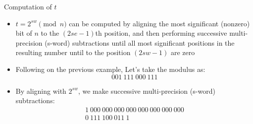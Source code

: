 \documentclass[xcolor=dvipsnames]{beamer}
\begin{document}
\begin{frame}{Computation of $t$}
\begin{itemize}

\item $t=2^{sw} \pmod{n}$ can be computed by aligning the most significant (nonzero)
bit of $n$ to the $(2se-1)$th position, and then performing successive 
multi-precision (s-word) subtractions
until all most significant positions in the resulting number until to the
position $(2sw-1)$ are zero

\item Following on the previous example, Let's take the modulus as:
\[
001~111~000~111
\]
\item By aligning with $2^{sw}$, we make successive 
multi-precision (s-word) subtractions:
\[
\begin{array}{l}
1~000~000~000~000~000~000~000~000 \\
0~111~100~011~1 \\
\end{array}
\]

\end{itemize}
\end{frame}
\end{document}
